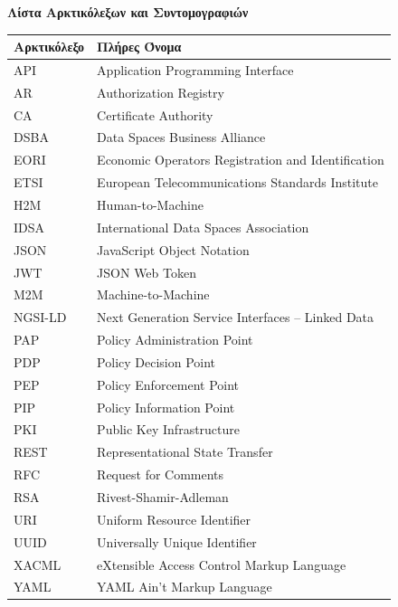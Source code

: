 \textbf{Λίστα Αρκτικόλεξων και Συντομογραφιών}
\begin{table}[H]
\centering
\begin{tabular}{|>{\centering\arraybackslash}m{3cm}|m{10cm}|}
\hline
\textbf{Αρκτικόλεξο} & \textbf{Πλήρες Όνομα} \\
\hline
\textlatin{API} & \textlatin{Application Programming Interface} \\
\hline
\textlatin{AR} & \textlatin{Authorization Registry} \\
\hline
\textlatin{CA} & \textlatin{Certificate Authority} \\
\hline
\textlatin{DSBA} & \textlatin{Data Spaces Business Alliance} \\
\hline
\textlatin{EORI} & \textlatin{Economic Operators Registration and Identification} \\
\hline
\textlatin{ETSI} & \textlatin{European Telecommunications Standards Institute} \\
\hline
\textlatin{H2M} & \textlatin{Human-to-Machine} \\
\hline
\textlatin{IDSA} & \textlatin{International Data Spaces Association} \\
\hline
\textlatin{JSON} & \textlatin{JavaScript Object Notation} \\
\hline
\textlatin{JWT} & \textlatin{JSON Web Token} \\
\hline
\textlatin{M2M} & \textlatin{Machine-to-Machine} \\
\hline
\textlatin{NGSI-LD} & \textlatin{Next Generation Service Interfaces -- Linked Data} \\
\hline
\textlatin{PAP} & \textlatin{Policy Administration Point} \\
\hline
\textlatin{PDP} & \textlatin{Policy Decision Point} \\
\hline
\textlatin{PEP} & \textlatin{Policy Enforcement Point} \\
\hline
\textlatin{PIP} & \textlatin{Policy Information Point} \\
\hline
\textlatin{PKI} & \textlatin{Public Key Infrastructure} \\
\hline
\textlatin{REST} & \textlatin{Representational State Transfer} \\
\hline
\textlatin{RFC} & \textlatin{Request for Comments} \\
\hline
\textlatin{RSA} & \textlatin{Rivest-Shamir-Adleman} \\
\hline
\textlatin{URI} & \textlatin{Uniform Resource Identifier} \\
\hline
\textlatin{UUID} & \textlatin{Universally Unique Identifier} \\
\hline
\textlatin{XACML} & \textlatin{eXtensible Access Control Markup Language} \\
\hline
\textlatin{YAML} & \textlatin{YAML Ain't Markup Language} \\
\hline
\end{tabular}
\label{tab:acronyms}
\end{table}

